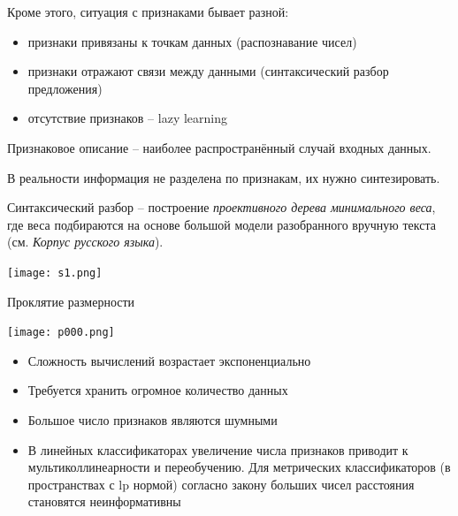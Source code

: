 \documentclass[pdf, intlimits, 9pt, unicode]{beamer}
\begin{document}
\begin{frame}
Кроме этого, ситуация с признаками бывает разной:

\begin{itemize}
\item признаки привязаны к точкам данных (распознавание чисел)\pause
\item признаки отражают связи между данными (синтаксический разбор предложения)\pause
\item отсутствие признаков -- lazy learning\pause
\end{itemize}

Признаковое описание -- наиболее распространённый случай входных данных.\pause

В реальности информация не разделена по признакам, их нужно синтезировать.
\end{frame}





\begin{frame}
Синтаксический разбор -- построение \emph{проективного дерева минимального веса}, где веса подбираются на основе большой модели разобранного вручную текста (см. \emph{Корпус русского языка}).

\begin{center}\texttt{[image: s1.png]}\end{center}
\end{frame}




%





\begin{frame}{Проклятие размерности}

\begin{center}\texttt{[image: p000.png]}\end{center}

\begin{itemize}
\item Сложность вычислений возрастает экспоненциально\pause
\item Требуется хранить огромное количество данных\pause
\item Большое число признаков являются шумными\pause
\item В линейных классификаторах увеличение числа признаков приводит к мультиколлинеарности и переобучению. Для метрических классификаторов (в пространствах с lp нормой) согласно закону больших чисел расстояния становятся неинформативны
\end{itemize}

\end{frame}
\end{document}
